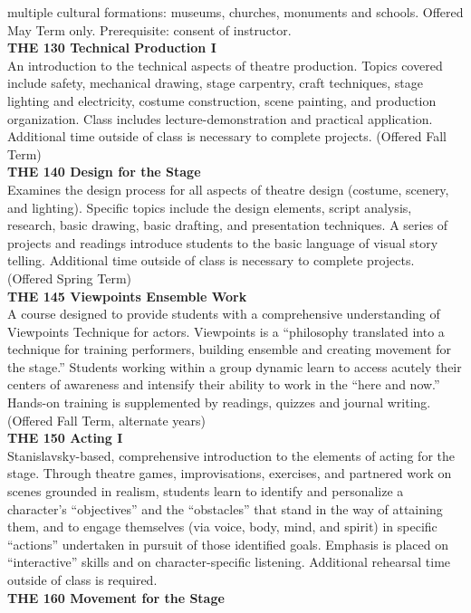 \documentclass[
  letterpaper,
]{scrbook}
\begin{document}
multiple cultural formations: museums, churches, monuments and schools.
Offered May Term only. Prerequisite: consent of instructor.\\
\textbf{THE 130 Technical Production I}\\
An introduction to the technical aspects of theatre production. Topics
covered include safety, mechanical drawing, stage carpentry, craft
techniques, stage lighting and electricity, costume construction, scene
painting, and production organization. Class includes
lecture-demonstration and practical application. Additional time outside
of class is necessary to complete projects. (Offered Fall Term)\\
\textbf{THE 140 Design for the Stage}\\
Examines the design process for all aspects of theatre design (costume,
scenery, and lighting). Specific topics include the design elements,
script analysis, research, basic drawing, basic drafting, and
presentation techniques. A series of projects and readings introduce
students to the basic language of visual story telling. Additional time
outside of class is necessary to complete projects. (Offered Spring
Term)\\
\textbf{THE 145 Viewpoints Ensemble Work}\\
A course designed to provide students with a comprehensive understanding
of Viewpoints Technique for actors. Viewpoints is a ``philosophy
translated into a technique for training performers, building ensemble
and creating movement for the stage.'' Students working within a group
dynamic learn to access acutely their centers of awareness and intensify
their ability to work in the ``here and now.'' Hands-on training is
supplemented by readings, quizzes and journal writing. (Offered Fall
Term, alternate years)\\
\textbf{THE 150 Acting I}\\
Stanislavsky-based, comprehensive introduction to the elements of acting
for the stage. Through theatre games, improvisations, exercises, and
partnered work on scenes grounded in realism, students learn to identify
and personalize a character's ``objectives'' and the ``obstacles'' that
stand in the way of attaining them, and to engage themselves (via voice,
body, mind, and spirit) in specific ``actions'' undertaken in pursuit of
those identified goals. Emphasis is placed on ``interactive'' skills and
on character-specific listening. Additional rehearsal time outside of
class is required.\\
\textbf{THE 160 Movement for the Stage}\\
\end{document}
